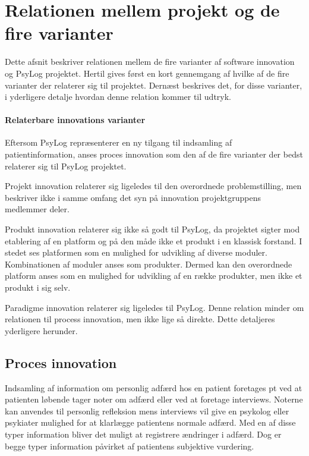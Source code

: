 \section{Relationen mellem projekt og de fire varianter}
Dette afsnit beskriver relationen mellem de fire varianter af software innovation\cite[Afsnit 5.1, Side 30-32]{art:essence} og PsyLog projektet.
Hertil gives først en kort gennemgang af hvilke af de fire varianter der relaterer sig til projektet.
Dernæst beskrives det, for disse varianter, i yderligere detalje hvordan denne relation kommer til udtryk.

\paragraph{Relaterbare innovations varianter}
Eftersom PsyLog repræsenterer en ny tilgang til indsamling af patientinformation, anses proces innovation som den af de fire varianter der bedst relaterer sig til PsyLog projektet.

Projekt innovation relaterer sig ligeledes til den overordnede problemstilling, men beskriver ikke i samme omfang det syn på innovation projektgruppens medlemmer deler.

Produkt innovation relaterer sig ikke så godt til PsyLog, da projektet sigter mod etablering af en platform og på den måde ikke et produkt i en klassisk forstand.
I stedet ses platformen som en mulighed for udvikling af diverse moduler.
Kombinationen af moduler anses som produkter.
Dermed kan den overordnede platform anses som en mulighed for udvikling af en række produkter, men ikke et produkt i sig selv.

Paradigme innovation relaterer sig ligeledes til PsyLog.
Denne relation minder om relationen til process innovation, men ikke lige så direkte.
Dette detaljeres yderligere herunder.


\subsection{Proces innovation}
Indsamling af information om personlig adfærd hos en patient foretages pt ved at patienten løbende tager noter om adfærd eller ved at foretage interviews.
Noterne kan anvendes til personlig refleksion mens interviews vil give en psykolog eller psykiater mulighed for at klarlægge patientens normale adfærd.
Med en af disse typer information bliver det muligt at registrere ændringer i adfærd.
Dog er begge typer information påvirket af patientens subjektive vurdering.

